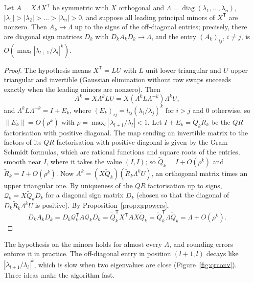 \begin{theorem}\label{thm:qrconv}
Let $A=X\Lambda X^{\mathsf T}$ be symmetric with $X$ orthogonal and $\Lambda=\operatorname{diag}(\lambda_1,\dots,\lambda_n)$,
$|\lambda_1|>|\lambda_2|>\dots>|\lambda_n|>0$, and suppose all leading principal minors of $X^{\mathsf T}$ are nonzero. Then $A_k\to\Lambda$ up to the signs of
the off-diagonal entries; precisely, there are diagonal sign matrices $D_k$ with $D_kA_kD_k\to\Lambda$, and the entry $(A_k)_{ij}$, $i\ne j$, is
$O(\max_{l}|\lambda_{l+1}/\lambda_l|^k)$.
\end{theorem}
\begin{proof}
The hypothesis means $X^{\mathsf T}=LU$ with $L$ unit lower triangular and $U$ upper triangular and invertible (Gaussian elimination without row swaps
succeeds exactly when the leading minors are nonzero). Then
\[
A^k=X\Lambda^kLU=X(\Lambda^kL\Lambda^{-k})\Lambda^kU,
\]
and $\Lambda^kL\Lambda^{-k}=I+E_k$, where $(E_k)_{ij}=l_{ij}(\lambda_i/\lambda_j)^k$ for $i>j$ and $0$ otherwise, so $\|E_k\|=O(\rho^k)$ with
$\rho=\max_l|\lambda_{l+1}/\lambda_l|<1$. Let $I+E_k=\tilde Q_k\tilde R_k$ be the $QR$ factorisation with positive diagonal. The map sending an invertible
matrix to the factors of its $QR$ factorisation with positive diagonal is given by the Gram--Schmidt formulas, which are rational functions and square
roots of the entries, smooth near $I$, where it takes the value $(I,I)$; so $\tilde Q_k=I+O(\rho^k)$ and $\tilde R_k=I+O(\rho^k)$. Now
$A^k=(X\tilde Q_k)(\tilde R_k\Lambda^kU)$, an orthogonal matrix times an upper triangular one. By uniqueness of the $QR$ factorisation up to signs,
$\mathcal Q_k=X\tilde Q_kD_k$ for a diagonal sign matrix $D_k$ (chosen so that the diagonal of $D_k\tilde R_k\Lambda^kU$ is positive). By
Proposition~\ref{prop:qrpowers},
\[
D_kA_kD_k=D_k\mathcal Q_k^{\mathsf T}A\mathcal Q_kD_k=\tilde Q_k^{\mathsf T}X^{\mathsf T}AX\tilde Q_k=\tilde Q_k^{\mathsf T}\Lambda\tilde Q_k=\Lambda+O(\rho^k).
\]
\end{proof}

The hypothesis on the minors holds for almost every $A$, and rounding errors enforce it in practice. The off-diagonal entry in position $(l+1,l)$ decays
like $|\lambda_{l+1}/\lambda_l|^k$, which is slow when two eigenvalues are close (Figure~\ref{fig:qrconv}). Three ideas make the algorithm fast.

